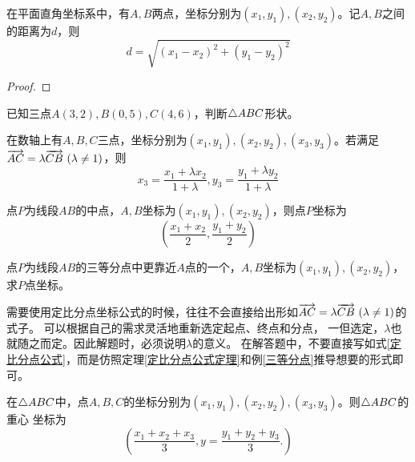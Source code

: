 \begin{theorem}[两点之间距离公式]
    在平面直角坐标系中，有\(A,B\)两点，坐标分别为\((x_1,y_1),(x_2,y_2)\)。记\(A,B\)之间的距离为\(d\)，则
    \begin{equation}
        d=\sqrt{(x_1-x_2)^2+(y_1-y_2)^2}
    \end{equation}
\end{theorem}
\begin{proof}
    
\end{proof}
\begin{exercise}
    已知三点\(A(3,2),B(0,5),C(4,6)\)，判断\(\triangle ABC\)形状。
\end{exercise}



\begin{theorem}
    在数轴上有\(A,B,C\)三点，坐标分别为\((x_1,y_1),(x_2,y_2),(x_3,y_3)\)。若满足\(\overrightarrow{AC}=\lambda\overrightarrow{CB} \ (\lambda\neq 1)\)，则
    \begin{equation}
        x_3=\frac{x_{1}+\lambda x_{2}}{1+\lambda}, y_3=\frac{y_{1}+\lambda y_{2}}{1+\lambda}
    \end{equation}
\end{theorem}
\begin{corollary}\label{定比分点公式定理}
    点\(P\)为线段\(AB\)的中点，\(A,B\)坐标为$(x_1,y_1),(x_2,y_2)$，则点\(P\)坐标为
    \begin{equation}\label{定比分点公式}
        \left(\frac{x_{1}+x_{2}}{2}, \frac{y_{1}+y_{2}}{2}\right)
    \end{equation}
\end{corollary}
\begin{example}\label{三等分点}
    点\(P\)为线段\(AB\)的三等分点中更靠近\(A\)点的一个，\(A,B\)坐标为$(x_1,y_1),(x_2,y_2)$，
    求\(P\)点坐标。
\end{example}

需要使用定比分点坐标公式的时候，往往不会直接给出形如\(\overrightarrow{AC}=\lambda\overrightarrow{CB} \ (\lambda\neq 1)\)的式子。
可以根据自己的需求灵活地重新选定起点、终点和分点，
一但选定，\(\lambda\)也就随之而定。因此解题时，必须说明\(\lambda\)的意义。
在解答题中，不要直接写如式\ref{定比分点公式}，而是仿照定理\ref{定比分点公式定理}和例\ref{三等分点}推导想要的形式即可。

\begin{theorem}
    在\(\triangle ABC\)中，点\(A,B,C\)的坐标分别为\((x_1,y_1),(x_2,y_2),(x_3,y_3)\)。则\(\triangle ABC\)的重心
    坐标为
    \begin{equation}
        \left(\frac{x_{1}+x_{2}+x_{3}}{3},  y=\frac{y_{1}+y_{2}+y_{3}}{3} .\right)
    \end{equation}
\end{theorem}

